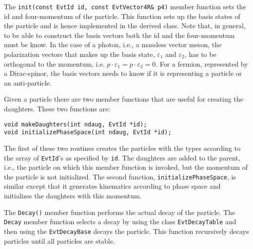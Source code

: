 The {\tt init(const EvtId id, const EvtVector4R\& p4)} member function sets the
id and four-momentum of the particle. This function sets up the basis states
of the particle and is hence implemented in the derived class. Note that,
in general, to be able to construct the basis vectors both the id and the 
four-momentum must be know. In the case of a photon, i.e., a massless
vector meson, the polarization vectors that makes up the basis state,
$\varepsilon_1$ and $\varepsilon_2$, has to be orthogonal to the momentum,
i.e. $p\cdot \varepsilon_1=p\cdot \varepsilon_2=0$. For a fermion, represented
by a Dirac-spinor, the basis vectors needs to know if it is representing
a particle or an anti-particle.

Given a particle there are two member functions that are useful for 
creating the daughters. These two functions are:
\begin{verbatim}	
void makeDaughters(int ndaug, EvtId *id);
void initializePhaseSpace(int ndaug, EvtId *id);
\end{verbatim}
The first of these two routines creates the particles with the types
according to the array of {\tt EvtId}'s as specified by {\tt id}. 
The daughters are added to the parent, i.e., the particle on which
this member function is invoked, but the momentum of the particle is
not initialized. The second function, {\tt initializePhaseSpace}, is
similar except that it generates kinematics according to phase space
and initializes the daughters with this momentum.

The {\tt Decay()} member function performs the actual decay of the
particle. The {\tt Decay} member function selects a decay by using
the class {\tt EvtDecayTable} and then using the {\tt EvtDecayBase}
decays the particle. This function recursively decays particles until
all particles are stable.


